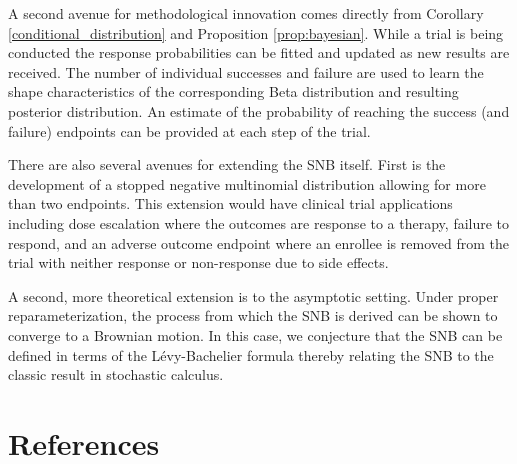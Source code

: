 \documentclass[review]{elsarticle}
\begin{document}
A second avenue for methodological innovation comes directly from
Corollary \ref{conditional_distribution} and Proposition \ref{prop:bayesian}.
While a trial is being conducted the response probabilities can be fitted
and updated as new results are received. The number of individual successes
and failure are used to learn the shape characteristics of the corresponding
Beta distribution and resulting posterior
distribution. An estimate of the probability of reaching the success (and
failure) endpoints can be provided at each step of the trial.

There are also several avenues for extending the SNB itself. First is the 
development of a stopped negative multinomial distribution allowing
for more than two endpoints. This extension would have clinical trial
applications including dose escalation where the outcomes are response
to a therapy, failure to respond, and an adverse outcome endpoint where
an enrollee is removed from the trial with neither response or non-response
due to side effects.

A second, more theoretical extension is to the asymptotic setting. Under
proper reparameterization, the process from which the SNB is derived 
can be shown to converge to a Brownian motion. In this case, we conjecture
that the SNB can be defined in terms of the L\'{e}vy-Bachelier 
\citep{Bachelier1900} formula
thereby relating the SNB to the classic result in stochastic calculus.

\section*{References}


\end{document}
